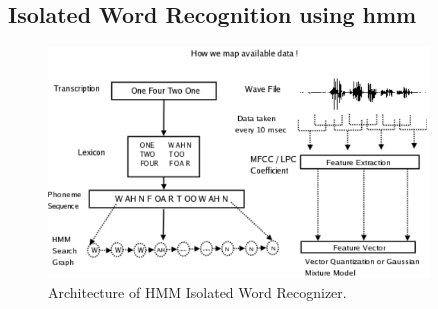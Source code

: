 \documentclass[12pt, a4paper, twoside]{report}
\begin{document}
\subsection{Isolated Word Recognition using \acrshort{hmm}}
\begin{figure}[!h]
	\centering
	\includegraphics[width=0.9\textwidth]
	{images/chapter4/asr-hmm}
	\caption{Architecture of HMM Isolated Word Recognizer.}
	\label{fig:asr-hmm}
\end{figure}
\end{document}
